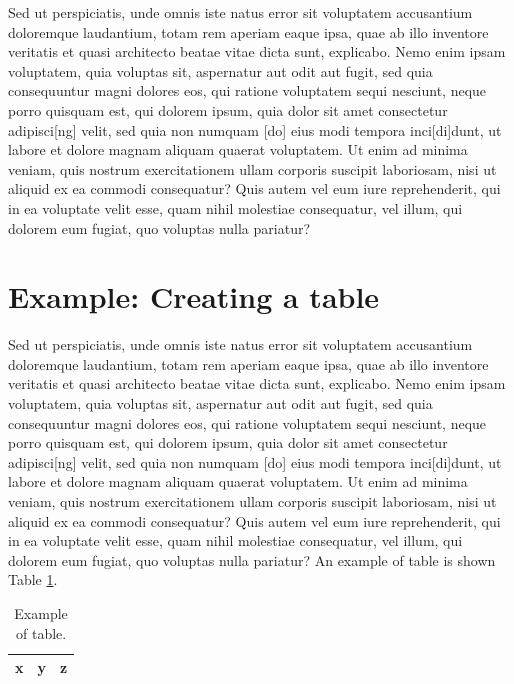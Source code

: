 \documentclass[a4paper,11pt]{article}
\begin{document}
Sed ut perspiciatis, unde omnis iste natus error sit voluptatem accusantium doloremque laudantium, totam rem aperiam eaque ipsa, quae ab illo inventore veritatis et quasi architecto beatae vitae dicta sunt, explicabo. Nemo enim ipsam voluptatem, quia voluptas sit, aspernatur aut odit aut fugit, sed quia consequuntur magni dolores eos, qui ratione voluptatem sequi nesciunt, neque porro quisquam est, qui dolorem ipsum, quia dolor sit amet consectetur adipisci[ng] velit, sed quia non numquam [do] eius modi tempora inci[di]dunt, ut labore et dolore magnam aliquam quaerat voluptatem. Ut enim ad minima veniam, quis nostrum exercitationem ullam corporis suscipit laboriosam, nisi ut aliquid ex ea commodi consequatur? Quis autem vel eum iure reprehenderit, qui in ea voluptate velit esse, quam nihil molestiae consequatur, vel illum, qui dolorem eum fugiat, quo voluptas nulla pariatur?


\section{Example: Creating a table}

Sed ut perspiciatis, unde omnis iste natus error sit voluptatem accusantium doloremque laudantium, totam rem aperiam eaque ipsa, quae ab illo inventore veritatis et quasi architecto beatae vitae dicta sunt, explicabo. Nemo enim ipsam voluptatem, quia voluptas sit, aspernatur aut odit aut fugit, sed quia consequuntur magni dolores eos, qui ratione voluptatem sequi nesciunt, neque porro quisquam est, qui dolorem ipsum, quia dolor sit amet consectetur adipisci[ng] velit, sed quia non numquam [do] eius modi tempora inci[di]dunt, ut labore et dolore magnam aliquam quaerat voluptatem. Ut enim ad minima veniam, quis nostrum exercitationem ullam corporis suscipit laboriosam, nisi ut aliquid ex ea commodi consequatur? Quis autem vel eum iure reprehenderit, qui in ea voluptate velit esse, quam nihil molestiae consequatur, vel illum, qui dolorem eum fugiat, quo voluptas nulla pariatur?
An example of table is shown Table \ref{tab:mytab}.
\begin{table}[!ht]
\begin{center}
\begin{tabular}{|c|c|c|}
\hline
x & y & z\\
\hline
\end{tabular}
\end{center}
\vspace{-20pt}
\caption{Example of table.} \label{tab:mytab}
  \vspace{-10pt}
\end{table}
\end{document}
